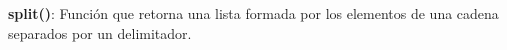 
\question \textbf{split()}: Función que retorna una lista formada por los
          elementos de una cadena separados por un delimitador.
